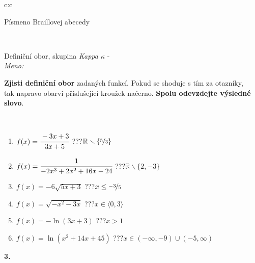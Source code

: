 \documentclass[10pt]{report}
\begin{document}
\begin{tabular}{c:c}
\begin{minipage}[c][104.5mm][t]{0.5\linewidth}
\begin{center}
\begin{minipage}{0.20\linewidth}
\begin{center}
{\small Písmeno Braillovej abecedy}
\end{center}
\end{minipage}
\end{center}
\end{minipage}
\\ \hdashline
\begin{minipage}[c][104.5mm][t]{0.5\linewidth}
\begin{center}
\vspace{7mm}
{\huge Definiční obor, skupina \textit{Kappa $\kappa$} -}\\[5mm]
\textit{Meno:}\phantom{xxxxxxxxxxxxxxxxxxxxxxxxxxxxxxxxxxxxxxxxxxxxxxxxxxxxxxxxxxxxxxxxx}\\[5mm]
\begin{minipage}{0.95\linewidth}
\textbf{Zjisti definiční obor} zadaných funkcí. Pokud se shoduje s tím za otazníky,\\tak napravo obarvi příslušející kroužek načerno. \textbf{Spolu odevzdejte výsledné slovo}.
\end{minipage}
\\[1mm]
\begin{minipage}{0.79\linewidth}
\begin{center}
\begin{varwidth}{\linewidth}
\begin{enumerate}
\normalsizerrr
\item $f(x)=\cfrac{-3x+3}{3x+5}$\quad \dotfill\; ???\;\dotfill \quad $\mathbb{R}\smallsetminus\{\nicefrac{5}{3}\}$
\item $f(x)=\cfrac{1}{-2x^3+2x^2+16x-24}$\quad \dotfill\; ???\;\dotfill \quad $\mathbb{R}\smallsetminus\{2,-3\}$
\item $f(x)=-6\sqrt{5x+3}$\quad \dotfill\; ???\;\dotfill \quad $x\leq\nicefrac{-3}{5}$
\item $f(x)=\sqrt{-x^2-3x}$\quad \dotfill\; ???\;\dotfill \quad $x\in\langle0 , 3\rangle$
\item $f(x)=-\ln{(3x+3)}$\quad \dotfill\; ???\;\dotfill \quad $x>1$
\item $f(x)=\ln{(x^2+14x+45)}$\quad \dotfill\; ???\;\dotfill \quad $x\in(-\infty , -9)\cup(-5 , \infty)$
\end{enumerate}
\end{varwidth}
\end{center}
\end{minipage}
\begin{minipage}{0.20\linewidth}
\begin{center}
{\Huge\bfseries 3.} \\[2mm]

\end{center}
\end{minipage}
\end{center}
\end{minipage}
\end{tabular}
\end{document}
